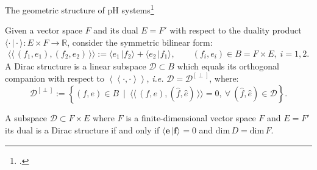 \documentclass[aspectratio=169]{beamer}
\newcommand{\dualpr}[3][]{\ensuremath{\langle #2 \, \vert #3 \rangle_{#1}}}
\newcommand{\bilprod}[2]{\langle \langle \, #1, #2 \, \rangle \rangle}
\begin{document}
\begin{frame}{The geometric structure of pH systems\footcite{courant1990}}
	\begin{definition}
		Given a vector space ${F}$ and its dual ${E}=F'$ with respect to the duality product $\dualpr{\cdot}{\cdot} : {E} \times {F} \rightarrow \mathbb{R}$, consider the symmetric bilinear form:
		$$
		\bilprod{({f}_1, {e}_1)}{({f}_2, {e}_2)} := {\dualpr{{e}_1}{{f}_2}} + {\dualpr{{e}_2}{{f}_1}}, \qquad ({f}_i, {e}_i) \in {B} = {F} \times {E}, \; i = 1, 2.
		$$
		A Dirac structure is a linear subspace $\mathcal{D} \subset {B}$ which equals its orthogonal companion with respect to $\left\langle \left\langle \cdot, \cdot \right\rangle \right\rangle$, {\it i.e.} $\mathcal{D} =\mathcal{D}^{[\perp]}$, where:
		$$
		\mathcal{D}^{[\perp]} := \left\{ ({f}, {e}) \in {B} ~ \mid ~ \bilprod{({f}, {e})}{(\widehat{{f}}, \widehat{{e}})} = 0, ~ \forall ~ (\widehat{{f}}, \widehat{{e}}) \in \mathcal{D} \right\}.
		$$
	\end{definition}
	\begin{theorem}
		A subspace $\mathcal{D} \subset F \times E$ where $F$ is a finite-dimensional vector space ${F}$ and ${E}=F'$ its dual is a Dirac structure if and only if $\dualpr{\mathbf{e}}{\mathbf{f}}=0$ and $\mathrm{dim}\, D = \mathrm{dim}\, F$.
	\end{theorem}
\end{frame}
\end{document}
